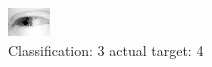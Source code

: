 \begin{figure}[h!]
\begin{center}
\includegraphics[width=0.60\columnwidth]{figures/ID2522_class_3_target_4.png}
\end{center}
\caption{ Classification: 3 actual target: 4}
\label{fig:ID2522_class_3_target_4}
\end{figure}
